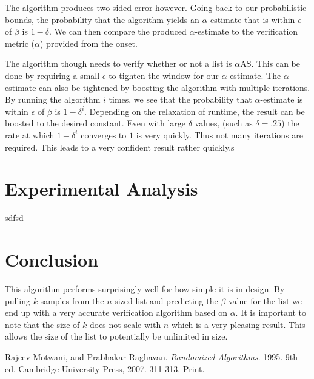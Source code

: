 \documentclass[11pt]{article}
\begin{document}
The algorithm produces two-sided error however. Going back to our probabilistic bounds, the probability that the algorithm yields an $\alpha$-estimate that is within $\epsilon$ of $\beta$ is $1 - \delta$. We can then compare the produced $\alpha$-estimate to the verification metric ($\alpha$) provided from the onset. 

The algorithm though needs to verify whether or not a list is $\alpha$AS. This can be done by requiring a small $\epsilon$ to tighten the window for our $\alpha$-estimate. The $\alpha$-estimate can also be tightened by boosting the algorithm with multiple iterations. By running the algorithm $i$ times, we see that the probability that $\alpha$-estimate is within $\epsilon$ of $\beta$ is $1 - \delta^i$. Depending on the relaxation of runtime, the result can be boosted to the desired constant. Even with large $\delta$ values, (such as $\delta = .25$) the rate at which $1 - \delta^i$ converges to $1$ is very quickly. Thus not many iterations are required. This leads to a very confident result rather quickly.s

\section{Experimental Analysis}

sdfsd

\section{Conclusion}

This algorithm performs surprisingly well for how simple it is in design. By pulling $k$ samples from the $n$ sized list and predicting the $\beta$ value for the list we end up with a very accurate verification algorithm based on $\alpha$. It is important to note that the size of $k$ does not scale with $n$ which is a very pleasing result. This allows the size of the list to potentially be unlimited in size.  

\begin{thebibliography}{2}

Rajeev Motwani, and Prabhakar Raghavan.
\textit{Randomized Algorithms}. 1995. 9th ed.
Cambridge University Press, 2007.
311-313. Print.

\end{thebibliography}
\end{document}
